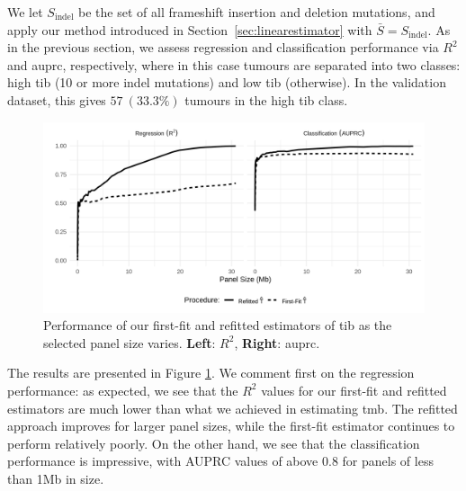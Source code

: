 \documentclass[12pt]{article}
\begin{document}
We let $S_{\text{indel}}$ be the set of all frameshift insertion and deletion mutations, and apply our method introduced in Section~\ref{sec:linearestimator} with $\bar{S} = S_{\text{indel}}$. As in the previous section, we assess regression and classification performance via $R^2$ and \gls{auprc}, respectively, where in this case tumours are separated into two classes: high \gls{tib} (10 or more indel mutations) and low \gls{tib} (otherwise). In the validation dataset, this gives $57 \ (33.3 \% )$ tumours in the high \gls{tib} class. 

\begin{figure}[htbp]
\centering
\includegraphics[width=6in]{figures/fig9.png}
\vspace*{-5mm}
\caption{Performance of our first-fit and refitted estimators of \gls{tib} as the selected panel size varies. \textbf{Left}: $R^2$, \textbf{Right}: \gls{auprc}. \label{fig:indelstatsplot}}
\vspace*{-2mm}
\end{figure}

The results are presented in Figure \ref{fig:indelstatsplot}. We comment first on the regression performance: as expected, we see that the $R^2$ values for our first-fit and refitted estimators are much lower than what we achieved in estimating \gls{tmb}. The refitted approach improves for larger panel sizes, while the first-fit estimator continues to perform relatively poorly. On the other hand, we see that the classification performance is impressive, with AUPRC values of above 0.8 for panels of less than 1Mb in size.
\end{document}
